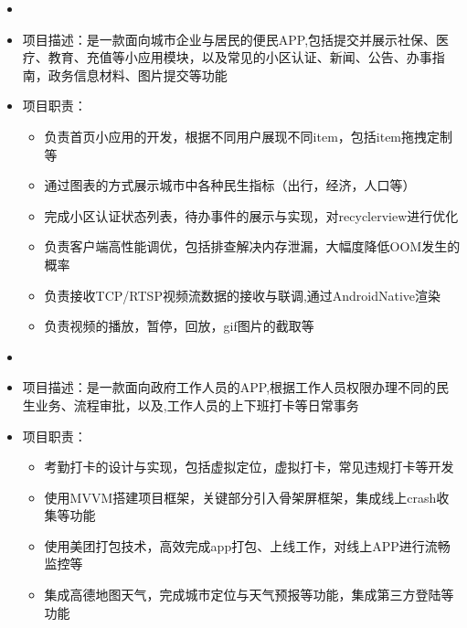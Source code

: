   \begin{itemize}[leftmargin=*]
    \item
      	 \item 项目描述：是一款面向城市企业与居民的便民APP,包括提交并展示社保、医疗、教育、充值等小应用模块，以及常见的小区认证、新闻、公告、办事指南，政务信息材料、图片提交等功能     
      	 \item 项目职责：
      {\small
      \begin{itemize}
      		\item 负责首页小应用的开发，根据不同用户展现不同item，包括item拖拽定制等
      		\item 通过图表的方式展示城市中各种民生指标（出行，经济，人口等）
      		\item 完成小区认证状态列表，待办事件的展示与实现，对recyclerview进行优化
      		\item 负责客户端高性能调优，包括排查解决内存泄漏，大幅度降低OOM发生的概率
      		\item 负责接收TCP/RTSP视频流数据的接收与联调,通过AndroidNative渲染
      		\item 负责视频的播放，暂停，回放，gif图片的截取等
      \end{itemize}
      }
    \item
      	\item 项目描述：是一款面向政府工作人员的APP,根据工作人员权限办理不同的民生业务、流程审批，以及,工作人员的上下班打卡等日常事务
      	\item 项目职责：
      {\small
      \begin{itemize}
      		\item 考勤打卡的设计与实现，包括虚拟定位，虚拟打卡，常见违规打卡等开发
      		\item 使用MVVM搭建项目框架，关键部分引入骨架屏框架，集成线上crash收集等功能
      		\item 使用美团打包技术，高效完成app打包、上线工作，对线上APP进行流畅监控等
      		\item 集成高德地图天气，完成城市定位与天气预报等功能，集成第三方登陆等功能	
      \end{itemize}
      }
  \end{itemize}